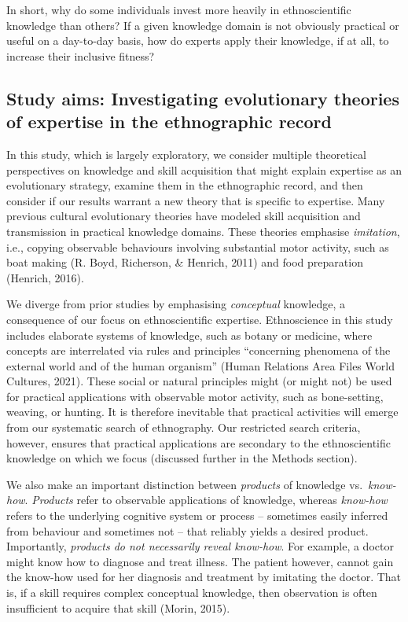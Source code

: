 \documentclass[
  11pt,
]{article}
\begin{document}
In short, why do some individuals invest more heavily in ethnoscientific knowledge than others? If a given knowledge domain is not obviously practical or useful on a day-to-day basis, how do experts apply their knowledge, if at all, to increase their inclusive fitness?

\hypertarget{study-aims-investigating-evolutionary-theories-of-expertise-in-the-ethnographic-record}{%
\subsection{Study aims: Investigating evolutionary theories of expertise in the ethnographic record}\label{study-aims-investigating-evolutionary-theories-of-expertise-in-the-ethnographic-record}}

In this study, which is largely exploratory, we consider multiple theoretical perspectives on knowledge and skill acquisition that might explain expertise as an evolutionary strategy, examine them in the ethnographic record, and then consider if our results warrant a new theory that is specific to expertise. Many previous cultural evolutionary theories have modeled skill acquisition and transmission in practical knowledge domains. These theories emphasise \emph{imitation}, i.e., copying observable behaviours involving substantial motor activity, such as boat making (R. Boyd, Richerson, \& Henrich, 2011) and food preparation (Henrich, 2016).

We diverge from prior studies by emphasising \emph{conceptual} knowledge, a consequence of our focus on ethnoscientific expertise. Ethnoscience in this study includes elaborate systems of knowledge, such as botany or medicine, where concepts are interrelated via rules and principles ``concerning phenomena of the external world and of the human organism'' (Human Relations Area Files World Cultures, 2021). These social or natural principles might (or might not) be used for practical applications with observable motor activity, such as bone-setting, weaving, or hunting. It is therefore inevitable that practical activities will emerge from our systematic search of ethnography. Our restricted search criteria, however, ensures that practical applications are secondary to the ethnoscientific knowledge on which we focus (discussed further in the Methods section).

We also make an important distinction between \emph{products} of knowledge vs.~\emph{know-how}. \emph{Products} refer to observable applications of knowledge, whereas \emph{know-how} refers to the underlying cognitive system or process -- sometimes easily inferred from behaviour and sometimes not -- that reliably yields a desired product. Importantly, \emph{products do not necessarily reveal know-how}. For example, a doctor might know how to diagnose and treat illness. The patient however, cannot gain the know-how used for her diagnosis and treatment by imitating the doctor. That is, if a skill requires complex conceptual knowledge, then observation is often insufficient to acquire that skill (Morin, 2015).
\end{document}
